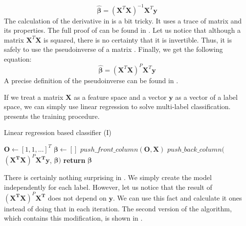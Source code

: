 \documentclass[english,a4paper,twoside]{ppfcmthesis}
\begin{document}
\begin{equation}\label{eq:LR5}
    \boldsymbol{\hat{\beta}} = (\boldsymbol{X}^T\boldsymbol{X})^{-1}\boldsymbol{X}^T\boldsymbol{y}
\end{equation}
The calculation of the derivative in  is a bit tricky. It uses a trace of matrix and its properties. The full proof of  can be found in . Let us notice that although a matrix $\boldsymbol{X}^T\boldsymbol{X}$ is squared, there is no certainty that it is invertible. Thus, it is safely to use the pseudoinverse of a matrix \citep{Trevor}. Finally, we get the following equation:
\begin{equation}\label{eq:LR_pseudo}
    \boldsymbol{\hat{\beta}} = (\boldsymbol{X}^T\boldsymbol{X})^{P}\boldsymbol{X}^T\boldsymbol{y}
\end{equation}
A precise definition of the pseudoinverse can be found in .

If we treat a matrix $\boldsymbol{X}$ as a feature space and a vector $\boldsymbol{y}$ as a vector of a label space, we can simply use linear regression to solve multi-label classification.  presents the training procedure.

\begin{algorithm}
    \caption{Linear regression based classifier (I)}\label{alg:LR0}
    \begin{algorithmic}[1]
        \State $\boldsymbol{O} \gets [1, 1, \ldots]^T$ 
        \State $\boldsymbol{\beta} \gets []$
        \State $push\_front\_column(\boldsymbol{O}, \boldsymbol{X})$
            \State $push\_back\_column($ $(\boldsymbol{X^T}\boldsymbol{X})^P\boldsymbol{X^T}\boldsymbol{y}$, $\boldsymbol{\beta})$ 
        \EndFor
        \State \textbf{return} $\boldsymbol{\beta}$
    \EndFunction
    \end{algorithmic}
\end{algorithm}
There is certainly nothing surprising in . We simply create the model independently for each label. However, let us notice that the result of $(\boldsymbol{X^T}\boldsymbol{X})^P\boldsymbol{X^T}$ does not depend on $\boldsymbol{y}$. We can use this fact and calculate it ones instead of doing that in each iteration. The second version of the algorithm, which contains this modification, is shown in . 
\end{document}

